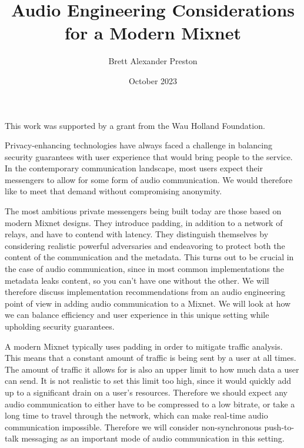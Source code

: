 \documentclass{article}
\title{Audio Engineering Considerations for a Modern Mixnet}
\author{Brett Alexander Preston}
\date{October 2023}
\begin{document}
\maketitle

\begin{center}
This work was supported by a grant from the Wau Holland Foundation.
\end{center}\medskip

\noindent Privacy-enhancing technologies have always faced a challenge in balancing security guarantees with user experience that would bring people to the service. In the contemporary communication landscape, most users expect their messengers to allow for some form of audio communication. We would therefore like to meet that demand without compromising anonymity.

The most ambitious private messengers being built today are those based on modern Mixnet designs. They introduce padding, in addition to a network of relays, and have to contend with latency. They distinguish themselves by considering realistic powerful adversaries and endeavoring to protect both the content of the communication and the metadata. This turns out to be crucial in the case of audio communication, since in most common implementations the metadata leaks content, so you can't have one without the other. We will therefore discuss implementation recommendations from an audio engineering point of view in adding audio communication to a Mixnet. We will look at how we can balance efficiency and user experience in this unique setting while upholding security guarantees.

\tableofcontents
\medskip

A modern Mixnet typically uses padding in order to mitigate traffic analysis. \cite{loopix} This means that a constant amount of traffic is being sent by a user at all times. The amount of traffic it allows for is also an upper limit to how much data a user can send. It is not realistic to set this limit too high, since it would quickly add up to a significant drain on a  user's resources. Therefore we should expect any audio communication to either have to be compressed to a low bitrate, or take a long time to travel through the network, which can make real-time audio communication impossible. %
Therefore we will consider non-synchronous push-to-talk messaging as an important mode of audio communication in this setting.
\end{document}
